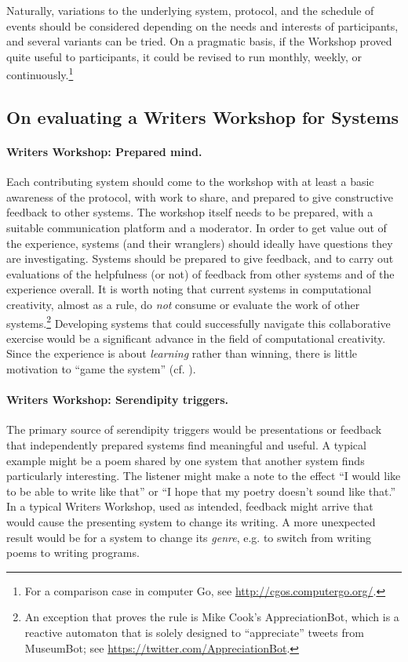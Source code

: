 \documentclass{llncs}
\begin{document}
Naturally, variations to the underlying system, protocol, and the
schedule of events should be considered depending on the needs and
interests of participants, and several variants can be tried.  On a
pragmatic basis, if the Workshop proved quite useful to participants,
it could be revised to run monthly, weekly, or
continuously.\footnote{For a comparison case in computer Go, see
  \url{http://cgos.computergo.org/}.}



\subsection{On evaluating a Writers Workshop for Systems}

\paragraph{Writers Workshop: Prepared mind.}
Each contributing system should come to the workshop with at least a
basic awareness of the protocol, with work to share, and prepared to
give constructive feedback to other systems.  The workshop itself
needs to be prepared, with a suitable communication platform and a
moderator.  In order to get value out of the experience, systems (and
their wranglers) should ideally have questions they are investigating.
Systems should be prepared to give feedback, and to carry out
evaluations of the helpfulness (or not) of feedback from other systems
and of the experience overall.  It is worth noting that current
systems in computational creativity, almost as a rule, do \emph{not}
consume or evaluate the work of other systems.\footnote{An exception
  that proves the rule is Mike Cook's {\sf AppreciationBot}, which is
   a reactive automaton that is solely designed to ``appreciate''
   tweets from {\sf MuseumBot}; see
  \url{https://twitter.com/AppreciationBot}.}  Developing systems that
could successfully navigate this collaborative exercise would be a
significant advance in the field of computational creativity.  Since
the experience is about \emph{learning} rather than winning, there is
little motivation to ``game the system''
(cf. \cite{lenat1983eurisko}).

\paragraph{Writers Workshop: Serendipity triggers.}

The primary source of serendipity triggers would be presentations or
feedback that independently prepared systems find meaningful and
useful.  A typical example might be a poem shared by one system that
another system finds particularly interesting.  The listener might
make a note to the effect ``I would like to be able to write like
that'' or ``I hope that my poetry doesn't sound like that.''  In a
typical Writers Workshop, used as intended, feedback might arrive that
would cause the presenting system to change its writing.  A more
unexpected result would be for a system to change its \emph{genre},
e.g. to switch from writing poems to writing programs.
\end{document}
